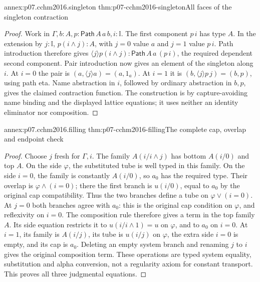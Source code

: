 \begin{annexitem}{annex:p07.cchm2016.singleton}
 {thm:p07-cchm2016-singleton}{All faces of the singleton contraction}
\begin{proof}
Work in \(\Gamma,b:A,p:\mathsf{Path}\,A\,a\,b,i:\mathbb I\).
The first component \(p\,i\) has type \(A\).  In the extension by
\(j:\mathbb I\), \(p(i\wedge j):A\), with \(j=0\) value \(a\)
and \(j=1\) value \(p\,i\).  Path introduction therefore gives
\(\langle j\rangle p(i\wedge j):
\mathsf{Path}\,A\,a\,(p\,i)\), the required dependent second component.
Pair introduction now gives an element of the singleton along \(i\).
At \(i=0\) the pair is
\((a,\langle j\rangle a)=(a,1_a)\).  At \(i=1\) it is
\((b,\langle j\rangle p\,j)=(b,p)\), using path eta.
Name abstraction in \(i\), followed by ordinary abstraction in \(b,p\),
gives the claimed contraction function.  The construction is by
capture-avoiding name binding and the displayed lattice equations;
it uses neither an identity eliminator nor composition.
\end{proof}
\end{annexitem}

\begin{annexitem}{annex:p07.cchm2016.filling}
 {thm:p07-cchm2016-filling}{The complete cap, overlap and endpoint check}
\begin{proof}
Choose \(j\) fresh for \(\Gamma,i\).  The family
\(A(i/i\wedge j)\) has bottom \(A(i/0)\) and top \(A\).
On the side \(\varphi\), the substituted tube is well typed in this
family.  On the side \(i=0\), the family is constantly \(A(i/0)\),
so \(a_0\) has the required type.  Their overlap is
\(\varphi\wedge(i=0)\); there the first branch is \(u(i/0)\),
equal to \(a_0\) by the original cap compatibility.  Thus the two
branches define a tube on \(\varphi\vee(i=0)\).
At \(j=0\) both branches agree with \(a_0\): this is the original cap
condition on \(\varphi\), and reflexivity on \(i=0\).
The composition rule therefore gives a term in the top family \(A\).
Its side equation restricts it to \(u(i/i\wedge1)=u\) on \(\varphi\),
and to \(a_0\) on \(i=0\).  At \(i=1\), its family is \(A(i/j)\),
its tube is \(u(i/j)\) on \(\varphi\), the extra side \(i=0\)
is empty, and its cap is \(a_0\).
Deleting an empty system branch and renaming \(j\) to \(i\) gives
the original composition term.  These operations are typed system
equality, substitution and alpha conversion, not a regularity axiom
for constant transport.  This proves all three judgmental equations.
\end{proof}
\end{annexitem}

